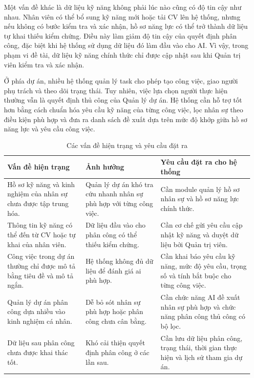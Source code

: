 \documentclass[../DoAn.tex]{subfiles}
\begin{document}
Một vấn đề khác là dữ liệu kỹ năng không phải lúc nào cũng có độ tin cậy như nhau. Nhân viên có thể bổ sung kỹ năng mới hoặc tải CV lên hệ thống, nhưng nếu không có bước kiểm tra và xác nhận, hồ sơ năng lực có thể trở thành dữ liệu tự khai thiếu kiểm chứng. Điều này làm giảm độ tin cậy của quyết định phân công, đặc biệt khi hệ thống sử dụng dữ liệu đó làm đầu vào cho AI. Vì vậy, trong phạm vi đề tài, dữ liệu kỹ năng chính thức chỉ được cập nhật sau khi Quản trị viên kiểm tra và xác nhận.

Ở phía dự án, nhiều hệ thống quản lý task cho phép tạo công việc, giao người phụ trách và theo dõi trạng thái. Tuy nhiên, việc lựa chọn người thực hiện thường vẫn là quyết định thủ công của Quản lý dự án. Hệ thống cần hỗ trợ tốt hơn bằng cách chuẩn hóa yêu cầu kỹ năng của từng công việc, lọc nhân sự theo điều kiện phù hợp và đưa ra danh sách đề xuất dựa trên mức độ khớp giữa hồ sơ năng lực và yêu cầu công việc.

\begin{table}[H]
    \centering
    \caption{Các vấn đề hiện trạng và yêu cầu đặt ra}
    \label{table:hien_trang_nghiep_vu}
    \begin{tabular}{|>{\raggedright\arraybackslash}p{}|>{\raggedright\arraybackslash}p{}|>{\raggedright\arraybackslash}p{}|}
        \hline
        \textbf{Vấn đề hiện trạng} & \textbf{Ảnh hưởng} & \textbf{Yêu cầu đặt ra cho hệ thống} \\ \hline
        Hồ sơ kỹ năng và kinh nghiệm của nhân sự chưa được tập trung hóa. & Quản lý dự án khó tra cứu nhanh nhân sự phù hợp với từng công việc. & Cần module quản lý hồ sơ nhân sự và hồ sơ năng lực chính thức. \\ \hline
        Thông tin kỹ năng có thể đến từ CV hoặc tự khai của nhân viên. & Dữ liệu đầu vào cho phân công có thể thiếu kiểm chứng. & Cần cơ chế gửi yêu cầu cập nhật kỹ năng và duyệt dữ liệu bởi Quản trị viên. \\ \hline
        Công việc trong dự án thường chỉ được mô tả bằng tiêu đề và mô tả ngắn. & Hệ thống không đủ dữ liệu để đánh giá ai phù hợp. & Cần khai báo yêu cầu kỹ năng, mức độ yêu cầu, trọng số và tính bắt buộc cho từng công việc. \\ \hline
        Quản lý dự án phân công dựa nhiều vào kinh nghiệm cá nhân. & Dễ bỏ sót nhân sự phù hợp hoặc phân công chưa cân bằng. & Cần chức năng AI đề xuất nhân sự phù hợp và chức năng phân công thủ công có bộ lọc. \\ \hline
        Dữ liệu sau phân công chưa được khai thác tốt. & Khó cải thiện quyết định phân công ở các lần sau. & Cần lưu dữ liệu phân công, trạng thái, thời gian thực hiện và lịch sử tham gia dự án. \\ \hline
    \end{tabular}
\end{table}
\end{document}
